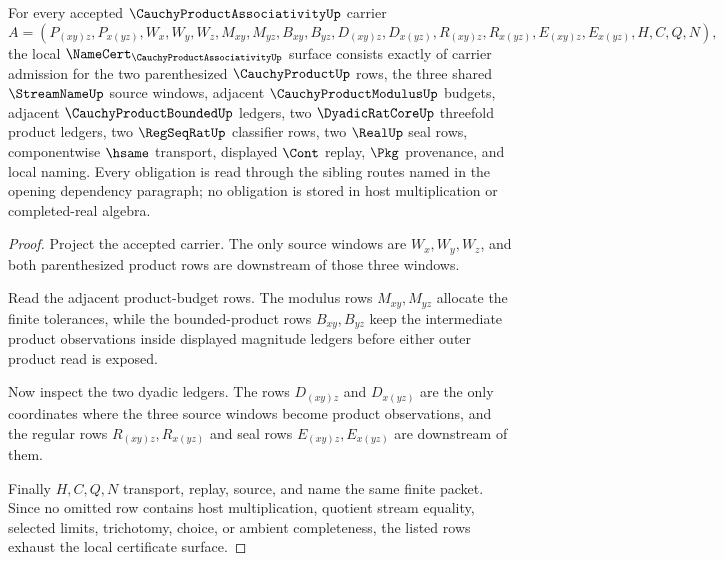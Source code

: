 \begin{theorem}
\label{thm:cauchy-product-associativity-namecert-obligations}
For every accepted $\CauchyProductAssociativityUp$ carrier
$$
A=(P_{(xy)z},P_{x(yz)},W_x,W_y,W_z,M_{xy},M_{yz},B_{xy},B_{yz},D_{(xy)z},D_{x(yz)},R_{(xy)z},R_{x(yz)},E_{(xy)z},E_{x(yz)},H,C,Q,N),
$$
the local $\NameCert_{\CauchyProductAssociativityUp}$ surface consists exactly of carrier admission for the two parenthesized $\CauchyProductUp$ rows, the three shared $\StreamNameUp$ source windows, adjacent $\CauchyProductModulusUp$ budgets, adjacent $\CauchyProductBoundedUp$ ledgers, two $\DyadicRatCoreUp$ threefold product ledgers, two $\RegSeqRatUp$ classifier rows, two $\RealUp$ seal rows, componentwise $\hsame$ transport, displayed $\Cont$ replay, $\Pkg$ provenance, and local naming. Every obligation is read through the sibling routes named in the opening dependency paragraph; no obligation is stored in host multiplication or completed-real algebra.
\end{theorem}
\begin{proof}
Project the accepted carrier. The only source windows are $W_x,W_y,W_z$, and both parenthesized product rows are downstream of those three windows.

Read the adjacent product-budget rows. The modulus rows $M_{xy},M_{yz}$ allocate the finite tolerances, while the bounded-product rows $B_{xy},B_{yz}$ keep the intermediate product observations inside displayed magnitude ledgers before either outer product read is exposed.

Now inspect the two dyadic ledgers. The rows $D_{(xy)z}$ and $D_{x(yz)}$ are the only coordinates where the three source windows become product observations, and the regular rows $R_{(xy)z},R_{x(yz)}$ and seal rows $E_{(xy)z},E_{x(yz)}$ are downstream of them.

Finally $H,C,Q,N$ transport, replay, source, and name the same finite packet. Since no omitted row contains host multiplication, quotient stream equality, selected limits, trichotomy, choice, or ambient completeness, the listed rows exhaust the local certificate surface.
\end{proof}

